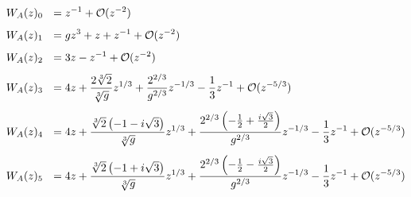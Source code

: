 \begin{sheetasymptotics}
    \begin{align*}
        \sheetlabel{W_A(z)_{0}} & ={}z^{-1}+\mathcal O(z^{-2}) \\[4pt]
        \sheetlabel{W_A(z)_{1}} & ={}gz^{3}+z+z^{-1}+\mathcal O(z^{-2}) \\[4pt]
        \sheetlabel{W_A(z)_{2}} & ={}3z-z^{-1}+\mathcal O(z^{-2}) \\[4pt]
        \sheetlabel{W_A(z)_{3}} & ={}4z+\frac{2 \sqrt[3]{2}}{\sqrt[3]{g}}z^{1/3}+\frac{2^{2/3}}{g^{2/3}}z^{-1/3}-\frac{1}{3}z^{-1}+\mathcal O(z^{-5/3}) \\[4pt]
        \sheetlabel{W_A(z)_{4}} & ={}4z+\frac{\sqrt[3]{2} \left(-1 - i \sqrt{3}\right)}{\sqrt[3]{g}}z^{1/3}+\frac{2^{2/3} \left(- \frac{1}{2} + \frac{i \sqrt{3}}{2}\right)}{g^{2/3}}z^{-1/3}-\frac{1}{3}z^{-1}+\mathcal O(z^{-5/3}) \\[4pt]
        \sheetlabel{W_A(z)_{5}} & ={}4z+\frac{\sqrt[3]{2} \left(-1 + i \sqrt{3}\right)}{\sqrt[3]{g}}z^{1/3}+\frac{2^{2/3} \left(- \frac{1}{2} - \frac{i \sqrt{3}}{2}\right)}{g^{2/3}}z^{-1/3}-\frac{1}{3}z^{-1}+\mathcal O(z^{-5/3})
    \end{align*}
\end{sheetasymptotics}
